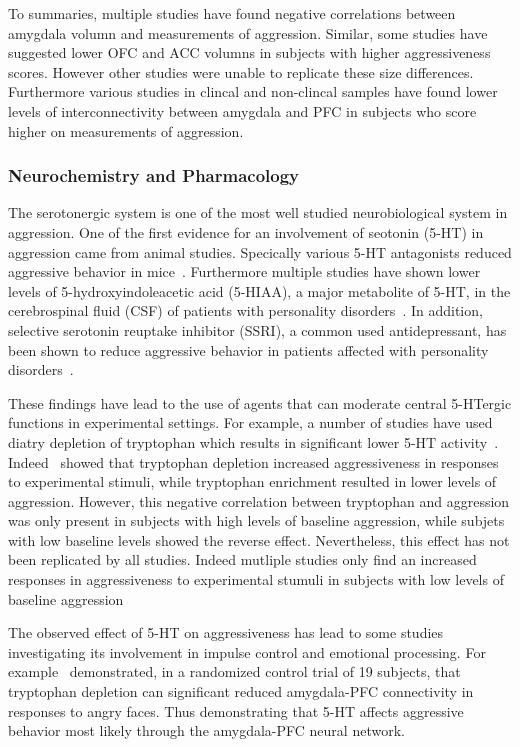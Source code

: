 To summaries, multiple studies have found negative correlations between amygdala volumn and measurements of aggression. 
Similar, some studies have suggested lower OFC and ACC volumns in subjects with higher aggressiveness scores.
However other studies were unable to replicate these size differences.
Furthermore various studies in clincal and non-clincal samples have found lower levels of interconnectivity between amygdala and PFC in subjects who score higher on measurements of aggression.

\subsubsection{Neurochemistry and Pharmacology}
\label{ssub:neurochemistry_and_pharmacology}

The serotonergic system is one of the most well studied neurobiological system in aggression.
One of the first evidence for an involvement of seotonin (5-HT) in aggression came from animal studies.
Specically various 5-HT antagonists reduced aggressive behavior in mice~\cite{Malick1976}.
Furthermore multiple studies have shown lower levels of 5-hydroxyindoleacetic acid (5-HIAA), a major metabolite of 5-HT, in the cerebrospinal fluid (CSF) of patients with personality disorders~\cite{Brown1982,Brown1979}.
In addition, selective serotonin reuptake inhibitor (SSRI), a common used antidepressant, has been shown to reduce aggressive behavior in patients affected with personality disorders~\cite{Zanarini2004,Coccaro1997a}. 

These findings have lead to the use of agents that can moderate central 5-HTergic functions in experimental settings.
For example, a number of studies have used diatry depletion of tryptophan which results in significant lower 5-HT activity~\cite{Williams1999,Carpenter1998}.
Indeed~\citet{Bjork2000} showed that tryptophan depletion increased  aggressiveness in responses to experimental stimuli, while tryptophan enrichment resulted in lower levels of aggression.
However, this negative correlation between tryptophan and aggression was only present in subjects with high levels of baseline aggression, while subjets with low baseline levels showed the reverse effect.
Nevertheless, this effect has not been replicated by all studies.
Indeed mutliple studies only find an increased responses in aggressiveness to experimental stumuli in subjects with low levels of baseline aggression~\cite{Stadler2008,Kotting2013,Kramer2011}

The observed effect of 5-HT on aggressiveness has lead to some studies investigating its involvement in impulse control and emotional processing.
For example~\citet{Passamonti2012} demonstrated, in a randomized control trial of 19 subjects, that tryptophan depletion can significant reduced amygdala-PFC connectivity in responses to angry faces.
Thus demonstrating that 5-HT affects aggressive behavior most likely through the amygdala-PFC neural network.

